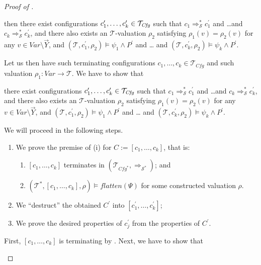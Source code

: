 \begin{proof}[Proof of ]
\begin{enumerate}
\begin{proofenv}
        then there exist configurations $c_1^\prime,\ldots,c_k^\prime \in \mathcal{T}_{\mathit{Cfg}}$
        such that $c_1 \Rightarrow^{*}_{\mathcal{S}} c_1^\prime$
        and \ldots and $c_k \Rightarrow^{*}_{\mathcal{S}} c_k^\prime$,
        and there also exists an $\mathcal{T}$-valuation $\rho_2$
        satisfying $\rho_1(v) = \rho_2(v)$ for any $v \in \mathit{Var} \setminus \vec{Y}$,
        and
        $(\mathcal{T}, c_1^\prime,\rho_2) \vDash \psi_1 \land P^\prime$ and \ldots
        and $(\mathcal{T}, c_k^\prime, \rho_2) \vDash \psi_k \land P^\prime$.
    \end{proofenv}
    Let us then have such terminating configurations $c_1,\ldots,c_k \in \mathcal{T}_{\mathit{Cfg}}$
    and such valuation $\rho_1 : \mathit{Var} \to \mathcal{T}$.
    We have to show that
    \begin{proofenv}
        there exist configurations $c_1^\prime,\ldots,c_k^\prime \in \mathcal{T}_{\mathit{Cfg}}$
        such that $c_1 \Rightarrow^{*}_{\mathcal{S}} c_1^\prime$
        and \ldots and $c_k \Rightarrow^{*}_{\mathcal{S}} c_k^\prime$,
        and there also exists an $\mathcal{T}$-valuation $\rho_2$
        satisfying $\rho_1(v) = \rho_2(v)$ for any $v \in \mathit{Var} \setminus \vec{Y}$,
        and
        $(\mathcal{T}, c_1^\prime,\rho_2) \vDash \psi_1 \land P^\prime$ and \ldots
        and $(\mathcal{T}, c_k^\prime, \rho_2) \vDash \psi_k \land P^\prime$.
    \end{proofenv}
    We will proceed in the following steps.
    \begin{enumerate}
        \item We prove the premise of (i) for $C := [c_1,\ldots,c_k]$, that is:
        \begin{enumerate}
            \item $[c_1,\ldots,c_k]$ terminates in $(\mathcal{T}_{\mathit{Cfg}^*}, \Rightarrow_{\mathcal{S}^*})$; and
            \item $(\mathcal{T}^*, [c_1,\ldots,c_k], \rho) \vDash \mathit{flatten}(\Psi)$ for some constructed valuation $\rho$.
        \end{enumerate}
        \item We ``destruct'' the obtained $C^\prime$ into $[c^\prime_1,\ldots,c^\prime_k]$;
        \item We prove the desired properties of $c^\prime_j$ from the properties of $C^\prime$.
    \end{enumerate}
    First, $[c_1,\ldots,c_k]$ is terminating by .
    Next, we have to show that
    \begin{proofenv}

\end{proofenv}
\end{enumerate}
\end{proof}
